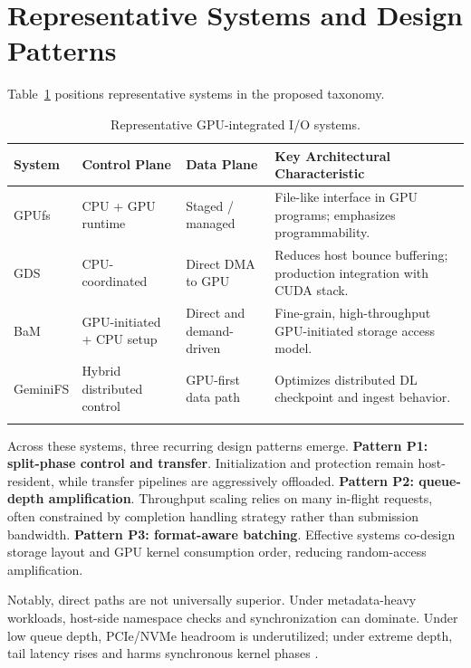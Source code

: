 \section{Representative Systems and Design Patterns}

Table~\ref{tab:systems} positions representative systems in the proposed taxonomy.

\begin{table}[t]
\caption{Representative GPU-integrated I/O systems.}
\label{tab:systems}
\centering
\begin{tabular}{@{}p{2.3cm}p{2.2cm}p{2.3cm}p{5.4cm}@{}}
\toprule
System & Control Plane & Data Plane & Key Architectural Characteristic \\
\midrule
GPUfs \cite{silberstein2013gpufs} & CPU + GPU runtime & Staged / managed & File-like interface in GPU programs; emphasizes programmability. \\
GDS \cite{nvidia_gds_overview} & CPU-coordinated & Direct DMA to GPU & Reduces host bounce buffering; production integration with CUDA stack. \\
BaM \cite{qureshi2023bam} & GPU-initiated + CPU setup & Direct and demand-driven & Fine-grain, high-throughput GPU-initiated storage access model. \\
GeminiFS \cite{geminifs2025} & Hybrid distributed control & GPU-first data path & Optimizes distributed DL checkpoint and ingest behavior. \\
\botrule
\end{tabular}
\end{table}

Across these systems, three recurring design patterns emerge. \textbf{Pattern P1: split-phase control and transfer}. Initialization and protection remain host-resident, while transfer pipelines are aggressively offloaded. \textbf{Pattern P2: queue-depth amplification}. Throughput scaling relies on many in-flight requests, often constrained by completion handling strategy rather than submission bandwidth. \textbf{Pattern P3: format-aware batching}. Effective systems co-design storage layout and GPU kernel consumption order, reducing random-access amplification.

Notably, direct paths are not universally superior. Under metadata-heavy workloads, host-side namespace checks and synchronization can dominate. Under low queue depth, PCIe/NVMe headroom is underutilized; under extreme depth, tail latency rises and harms synchronous kernel phases \cite{nvme_spec,nvidia_gds_best_practices}.
